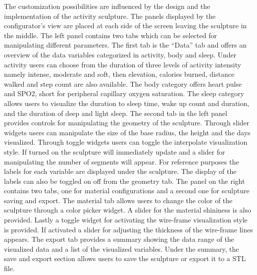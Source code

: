 \documentclass[../medieninformatik-arbeit.tex]{subfiles}
\begin{document}
The customization possibilities are influenced by the design and the implementation of the activity sculpture. The panels displayed by the configurator's view are placed at each side of the screen leaving the sculpture in the middle. The left panel contains two tabs which can be selected for manipulating different parameters. The first tab is the ``Data'' tab and offers an overview of the data variables categorized in activity, body and sleep. Under activity users can choose from the duration of three levels of activity intensity namely intense, moderate and soft, then elevation, calories burned, distance walked and step count are also available. The body category offers heart pulse and SPO2, short for peripheral capillary oxygen saturation. The sleep category allows users to visualize the duration to sleep time, wake up count and duration, and the duration of deep and light sleep. The second tab in the left panel provides controls for manipulating the geometry of the sculpture. Through slider widgets users can manipulate the size of the base radius, the height and the days visualized. Through toggle widgets users can toggle the interpolate visualization style. If turned on the sculpture will immediately update and a slider for manipulating the number of segments will appear. For reference purposes the labels for each variable are displayed under the sculpture. The display of the labels can also be toggled on off from the geometry tab. The panel on the right contains two tabs, one for material configurations and a second one for sculpture saving and export. The material tab allows users to change the color of the sculpture through a color picker widget. A slider for the material shininess is also provided. Lastly a toggle widget for activating the wire-frame visualization style is provided. If activated a slider for adjusting the thickness of the wire-frame lines appears. The export tab provides a summary showing the data range of the visualized data and a list of the visualized variables. Under the summary, the save and export section allows users to save the sculpture or export it to a STL file. 
\end{document}
